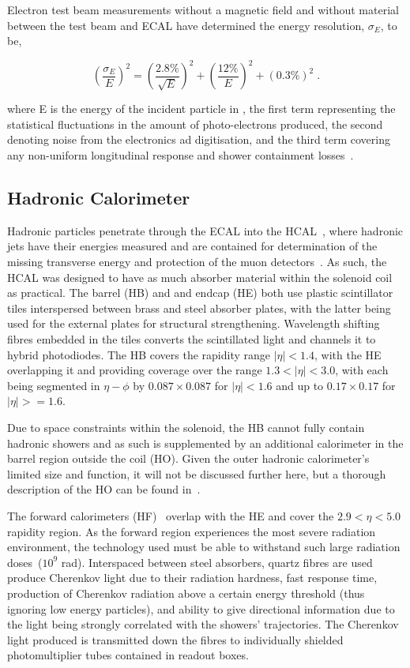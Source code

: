 Electron test beam measurements without a magnetic field and without material between the test beam and ECAL have determined the energy resolution, $\sigma_{E}$, to be,

\begin{equation}
(\frac{\sigma_{E}}{E})^{2} = (\frac{2.8\%}{\sqrt{E}})^{2} + (\frac{12\%}{E})^{2} + (0.3\%)^{2} \;.
\label{eq:ecalResolution}
\end{equation}

where E is the energy of the incident particle in \GeV, the first term representing the statistical fluctuations in the amount of photo-electrons produced, the second denoting noise from the electronics ad digitisation, and the third term covering any non-uniform longitudinal response and shower containment losses~\cite{Adzic:2007mi}.

\subsection{Hadronic Calorimeter}\label{subsec:HCAL}
Hadronic particles penetrate through the ECAL into the HCAL~\cite{CMS:1997xji}, where hadronic jets have their energies measured and are contained for determination of the missing transverse energy and protection of the muon detectors~\cite{HCAL:tdr}.
As such, the HCAL was designed to have as much absorber material within the solenoid coil as practical. 
The barrel (HB) and and endcap (HE) both use plastic scintillator tiles interspersed between brass and steel absorber plates, with the latter being used for the external plates for structural strengthening.
Wavelength shifting fibres embedded in the tiles converts the scintillated light and channels it to hybrid photodiodes.
The HB covers the rapidity range $|\eta| < 1.4$, with the HE overlapping it and providing coverage over the range $1.3 < |\eta| < 3.0$, with each being segmented in $\eta - \phi$ by $0.087 \times 0.087$ for $| \eta | < 1.6$ and up to $0.17 \times 0.17$ for $| \eta | >= 1.6$.

Due to space constraints within the solenoid, the HB cannot fully contain hadronic showers and as such is supplemented by an additional calorimeter in the barrel region outside the coil (HO). Given the outer hadronic calorimeter's limited size and function, it will not be discussed further here, but a thorough description of the HO can be found in~\cite{HO}.

The forward calorimeters (HF)~\cite{HF} overlap with the HE and cover the $2.9 < \eta < 5.0$ rapidity region.
As the forward region experiences the most severe radiation environment, the technology used must be able to withstand such large radiation doses~($10^{9}$ rad). 
Interspaced between steel absorbers, quartz fibres are used produce Cherenkov light due to their radiation hardness, fast response time, production of Cherenkov radiation above a certain energy threshold (thus ignoring low energy particles), and ability to give directional information due to the light being strongly correlated with the showers' trajectories.
The Cherenkov light produced is transmitted down the fibres to individually shielded photomultiplier tubes contained in readout boxes.

